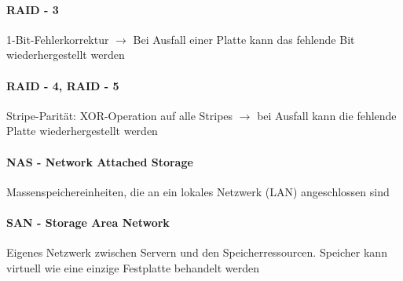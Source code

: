 \documentclass[10pt,a4paper,landscape]{article}
\begin{document}
\begin{multicols*}{3}
	\paragraph{RAID - 3} 1-Bit-Fehlerkorrektur $\rightarrow$ Bei Ausfall einer Platte kann das fehlende Bit wiederhergestellt werden
	\paragraph{RAID - 4, RAID - 5} Stripe-Parität: XOR-Operation auf alle Stripes $\rightarrow$ bei Ausfall kann die fehlende Platte wiederhergestellt werden
	\paragraph{NAS - Network Attached Storage} Massenspeichereinheiten, die an ein lokales Netzwerk (LAN) angeschlossen sind
	\paragraph{SAN - Storage Area Network} Eigenes Netzwerk zwischen Servern und den Speicherressourcen. Speicher kann virtuell wie eine einzige Festplatte behandelt werden
	\end{multicols*}
\end{document}
